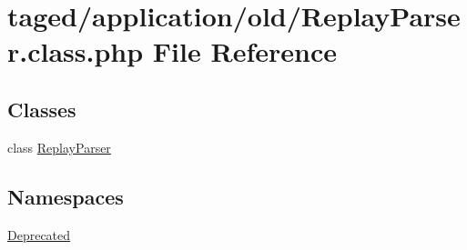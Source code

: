 \hypertarget{_replay_parser_8class_8php}{}\section{taged/application/old/\+Replay\+Parser.class.\+php File Reference}
\label{_replay_parser_8class_8php}
\subsection*{Classes}
\begin{DoxyCompactItemize}
\item 
class \hyperlink{class_replay_parser}{Replay\+Parser}
\end{DoxyCompactItemize}
\subsection*{Namespaces}
\begin{DoxyCompactItemize}
\item 
 \hyperlink{namespace_deprecated}{Deprecated}
\end{DoxyCompactItemize}
